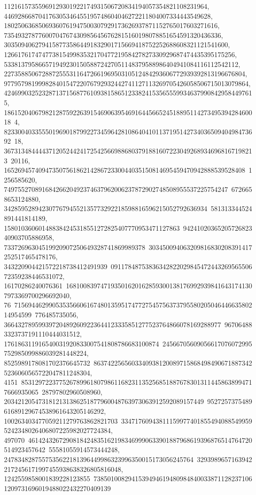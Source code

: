 {{{   11216157355969129301922174931506720834194057354821108231964, 
   446928668704176305346455195748604046272211804007334443549628, 
   18025063685069360761947500307929173626937871152765017603271616, 
   735493278776007047674309856456762815160198078851654591320436336, 
   30350940627941587735864491832901715669418752252688608321121541600, 
   1266176174747738154998353217047721958427827330929687474435395175256, 
   53381379586657194923015058872427051148379588986404941084116112542112, 
   2273588506728872555311647266196950310512484293606772939392813196676804, 
   97795798199982840154722076792932442741127113269705426058506715013079864, 
   4246990325232871371568776109381586512338241535655599346379908429584497615, 
   18615204067982128759226391546906395469164456652451889511427349539428460018\
4, 
   82330040335550196901879922734596428108640410113719514273403650940498473692\
18, 3673134844443712052442417254256698868037918816072230492689346968167198213\
20116, 1652694574094735075618621428672330044035150814695459470942888539528408\
1256585620, 74975527089168426620492374637962006237872902748508955537225754247\
6726658653124880, 34285952894230776794552135773292218598816596215052792636934\
581313344524891441814189, 158010360601488384245318551272825407770953471127863\
9424102036520572682340903705886958, 73372696304519920907250649328741869989378\
303450094063209816830208391417252517465478176, 343220904421572218738412491939\
0911784875383634282202984547244326956550672359238446531072, 16170286240076361\
1681008397471935016201628593001381769929398416431741307973369700296692040, 76\
71569446299053535660616748013595174772754575637379558020504644663580214954599\
776485735056, 366432789599397204892609223644123335851277523764866078169288977\
967064883323737191110444031512, 176186311916540031920833007541808786683100874\
24566705609056617076072995752985099886039281448224, 8525989178081702376645732\
86374225656033409381200897158684984906718873425236060565722047811248304, 4151\
85312972237752678996180798611682311352568518876783013114458638994717666935065\
28797802960508960, 2034212054731812131386251877960048763973063912592089157449\
952725737548961689129674538961643205146292, 100263403477059211279763862821703\
334717609438111599774018554940885499595242348026406807225982027724384, 497070\
46142432672908184248351621983469990633901887968619396876514764720514923457642\
55581055914573444248, 2478348287557535622181396449986323996350015173056245764\
32939896571639422172456171997455938638326805816048, 1242559858001839228123855\
73850100829415394946194809848400338711282371061209731696019488022432270409139\
}}}
